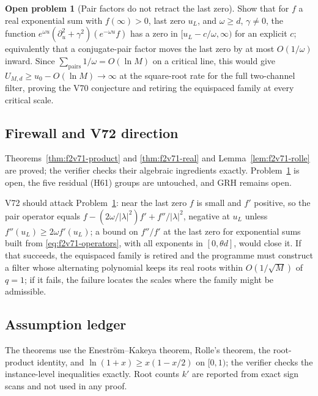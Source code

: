 \documentclass[11pt]{article}
\theoremstyle{definition}
\newtheorem{problem}[theorem]{Open problem}
\theoremstyle{remark}
\begin{document}
\begin{problem}[Pair factors do not retract the last zero]
\label{prob:f2v71-pairs}
Show that for \(f\) a real exponential sum with \(f(\infty)>0\), last
zero \(u_L\), and \(\omega\ge d\), \(\gamma\ne0\), the function
\(e^{\omega u}(\partial_u^2+\gamma^2)(e^{-\omega u}f)\) has a zero in
\([u_L-c/\omega,\infty)\) for an explicit \(c\); equivalently that a
conjugate-pair factor moves the last zero by at most \(O(1/\omega)\)
inward.  Since \(\sum_{\text{pairs}}1/\omega=O(\ln M)\) on a critical
line, this would give \(U_{M,d}\ge u_0-O(\ln M)\to\infty\) at the
square-root rate for the full two-channel filter, proving the V70
conjecture and retiring the equispaced family at every critical scale.
\end{problem}

\subsection*{Firewall and V72 direction}
\label{fire:f2v71}
Theorems~\ref{thm:f2v71-product} and \ref{thm:f2v71-real} and
Lemma~\ref{lem:f2v71-rolle} are proved; the verifier checks their
algebraic ingredients exactly.  Problem~\ref{prob:f2v71-pairs} is open,
the five residual (H61) groups are untouched, and GRH remains open.

V72 should attack Problem~\ref{prob:f2v71-pairs}: near the last zero
\(f\) is small and \(f'\) positive, so the pair operator equals
\(f-(2\omega/|\lambda|^2)f'+f''/|\lambda|^2\), negative at \(u_L\) unless
\(f''(u_L)\ge2\omega f'(u_L)\); a bound on \(f''/f'\) at the last zero for
exponential sums built from \eqref{eq:f2v71-operators}, with all
exponents in \([0,\theta d]\), would close it.  If that succeeds, the
equispaced family is retired and the programme must construct a filter
whose alternating polynomial keeps its real roots within
\(O(1/\sqrt M)\) of \(q=1\); if it fails, the failure locates the
scales where the family might be admissible.

\subsection*{Assumption ledger}
\label{ass:f2v71}
The theorems use the Enestr\"om--Kakeya theorem, Rolle's theorem, the
root-product identity, and \(\ln(1+x)\ge x(1-x/2)\) on \([0,1)\); the
verifier checks the instance-level inequalities exactly.  Root counts
\(k'\) are reported from exact sign scans and not used in any proof.
\endgroup
\end{document}
